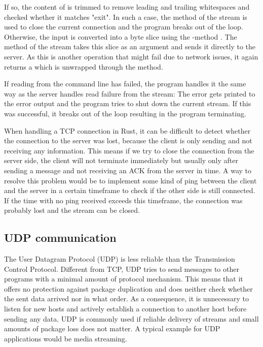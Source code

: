 If so, the content of  is trimmed to remove leading and trailing whitespaces and checked whether it matches
"exit". In such a case, the  method of the stream is used to close the current connection and the
program breaks out of the loop. Otherwise, the input  is converted into a byte slice using the
-method . The method  of the stream takes this slice as an argument and
sends it directly to the server. As this is another operation that might fail due to network issues, it again returns
a  which is unwrapped through the  method.

If reading from the command line has failed, the program handles it the same way as the server handles read failure
from the stream: The error gets printed to the error output and the program tries to shut down the current stream. If
this was successful, it breaks out of the loop resulting in the program terminating.

When handling a TCP connection in Rust, it can be difficult to detect whether the connection to the server was lost,
because the client is only sending and not receiving any information. This means if we try to close the connection from
the server side, the client will not terminate immediately but usually only after sending a message and not receiving
an ACK from the server in time. A way to resolve this problem would be to implement some kind of ping between the
client and the server in a certain timeframe to check if the other side is still connected. If the time with no ping
received exceeds this timeframe, the connection was probably lost and the stream can be closed.

\subsection{UDP communication}
The User Datagram Protocol (UDP) is less reliable than the Transmission Control Protocol. Different from TCP, UDP tries
to send messages to other programs with a minimal amount of protocol mechanism. This means that it offers no protection
against package duplication and does neither check whether the sent data arrived nor in what order. As a consequence,
it is unnecessary to listen for new hosts and actively establish a connection to another host before sending any data.
UDP is commonly used if reliable delivery of streams and small amounts of package loss does not matter. A typical
example for UDP applications would be media streaming. \cite{RFC0768}

